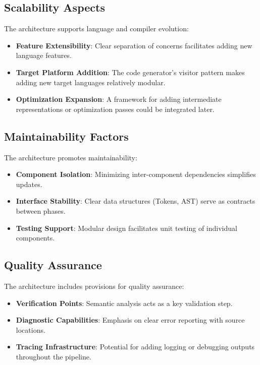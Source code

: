 \documentclass[conference]{IEEEtran}
\begin{document}
\subsection{Scalability Aspects}
The architecture supports language and compiler evolution:
\begin{itemize}
    \item \textbf{Feature Extensibility}: Clear separation of concerns facilitates adding new language features.
    \item \textbf{Target Platform Addition}: The code generator's visitor pattern makes adding new target languages relatively modular.
    \item \textbf{Optimization Expansion}: A framework for adding intermediate representations or optimization passes could be integrated later.
\end{itemize}

\subsection{Maintainability Factors}
The architecture promotes maintainability:
\begin{itemize}
    \item \textbf{Component Isolation}: Minimizing inter-component dependencies simplifies updates.
    \item \textbf{Interface Stability}: Clear data structures (Tokens, AST) serve as contracts between phases.
    \item \textbf{Testing Support}: Modular design facilitates unit testing of individual components.
\end{itemize}

\subsection{Quality Assurance}
The architecture includes provisions for quality assurance:
\begin{itemize}
    \item \textbf{Verification Points}: Semantic analysis acts as a key validation step.
    \item \textbf{Diagnostic Capabilities}: Emphasis on clear error reporting with source locations.
    \item \textbf{Tracing Infrastructure}: Potential for adding logging or debugging outputs throughout the pipeline.
\end{itemize}


\end{document}
